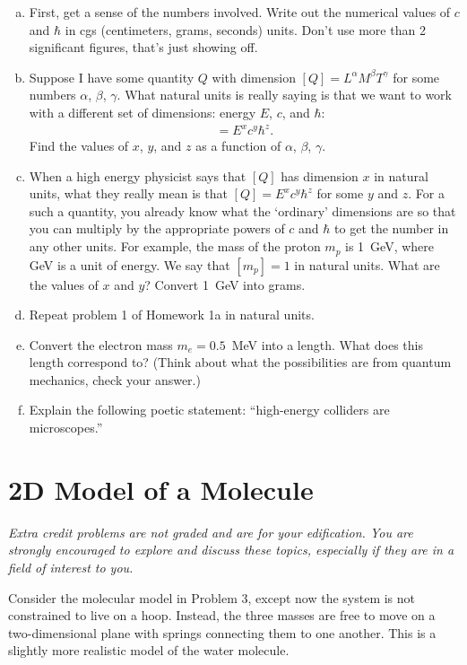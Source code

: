\documentclass[12pt]{article}
\numberwithin{equation}{section}    %
\begin{document}
\begin{enumerate}[(a)]
	\item First, get a sense of the numbers involved. Write out the numerical values of $c$ and $\hbar$ in cgs (centimeters, grams, seconds) units. Don't use more than 2 significant figures, that's just showing off. 
	\item Suppose I have some quantity $Q$ with dimension $[Q] = L^\alpha M^\beta T^\gamma$ for some numbers $\alpha$, $\beta$, $\gamma$. What natural units is really saying is that we want to work with a different set of dimensions: energy $E$, $c$, and $\hbar$:
		\begin{align*}
			[Q] = E^x c^y \hbar^z .
		\end{align*}
		Find the values of $x$, $y$, and $z$ as a function of $\alpha$, $\beta$, $\gamma$.
	\item When a high energy physicist says that $[Q]$ has dimension $x$ in natural units, what they really mean is that $[Q] = E^x c^y \hbar^z$ for some $y$ and $z$. For a such a quantity, you already know what the `ordinary' dimensions are so that you can multiply by the appropriate powers of $c$ and $\hbar$ to get the number in any other units. For example, the mass of the proton $m_p$ is 1~GeV, where GeV is a unit of energy. We say that $[m_p] = 1$ in natural units. What are the values of $x$ and $y$? Convert 1~GeV into grams.
	\item Repeat problem 1 of Homework 1a in natural units.
	\item Convert the electron mass $m_e = 0.5$~MeV into a length. What does this length correspond to? (Think about what the possibilities are from quantum mechanics, check your answer.)
	\item Explain the following poetic statement: ``high-energy colliders are microscopes.''
\end{enumerate}



\section{2D Model of a Molecule}

\emph{Extra credit problems are not graded and are for your edification. You are strongly encouraged to explore and discuss these topics, especially if they are in a field of interest to you.}

Consider the molecular model in Problem 3, except now the system is not constrained to live on a hoop. Instead, the three masses are free to move on a two-dimensional plane with springs connecting them to one another. This is a slightly more realistic model of the water molecule. 
\end{document}
